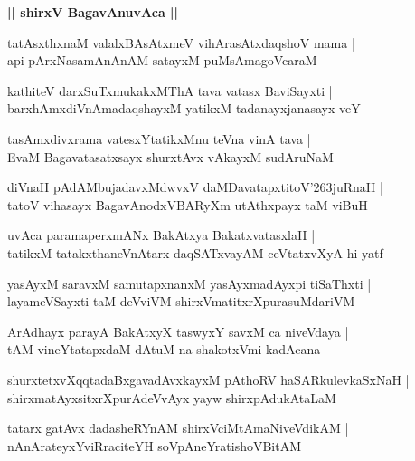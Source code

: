 \documentclass[twoside,12pt,openright]{book}
\def\S{\char'263}
\newcounter{shloka}[chapter]
\def\uvaca#1{\centerline{{\large\textbf{#1}}}}
\begin{document}
\uvaca{|| shirxV BagavAnuvAca ||}

\begin{shloka}%
tatAsxthxnaM valalxBAsAtxmeV vihArasAtxdaqshoV mama |\\
api pArxNasamAnAnAM satayxM puMsAmagoVcaraM 
\end{shloka}

\begin{shloka}%
kathiteV darxSuTxmukakxMThA tava vatasx BaviSayxti |\\
barxhAmxdiVnAmadaqshayxM yatikxM tadanayxjanasayx veY
\end{shloka}

\begin{shloka}%
tasAmxdivxrama vatesxYtatikxMnu teVna vinA tava |\\
EvaM Bagavatasatxsayx shurxtAvx vAkayxM sudAruNaM 
\end{shloka}

\begin{shloka}%
diVnaH pAdAMbujadavxMdwvxV daMDavatapxtitoV\S juRnaH |\\
tatoV vihasayx BagavAnodxVBARyXm utAthxpayx taM viBuH
\end{shloka}

\begin{shloka}%
uvAca paramaperxmANx BakAtxya BakatxvatasxlaH |\\
tatikxM tatakxthaneVnAtarx daqSATxvayAM ceVtatxvXyA hi yatf 
\end{shloka}

\begin{shloka}%
yasAyxM saravxM samutapxnanxM yasAyxmadAyxpi tiSaThxti |\\
layameVSayxti taM deVviVM shirxVmatitxrXpurasuMdariVM 
\end{shloka}

\begin{shloka}%
ArAdhayx parayA BakAtxyX taswyxY savxM ca niveVdaya |\\
tAM vineYtatapxdaM dAtuM na shakotxVmi kadAcana
\end{shloka}

\begin{shloka}%
shurxtetxvXqqtadaBxgavadAvxkayxM pAthoRV haSARkulevkaSxNaH |\\
shirxmatAyxsitxrXpurAdeVvAyx yayw shirxpAdukAtaLaM 
\end{shloka}

\begin{shloka}%
tatarx gatAvx dadasheRYnAM shirxVciMtAmaNiveVdikAM |\\
nAnArateyxYviRraciteYH soVpAneYratishoVBitAM
\end{shloka}
\end{document}
